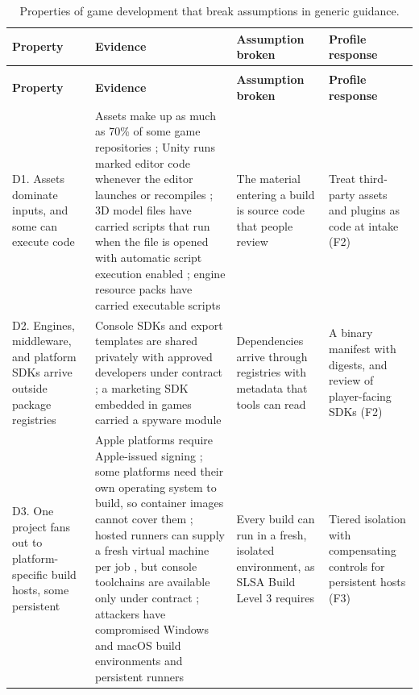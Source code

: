 \documentclass[acmsmall,screen,review]{acmart}
\begin{document}
\begingroup
\footnotesize
\begin{xltabular}{\linewidth}{@{}>{\hsize\raggedright\arraybackslash}X>{\hsize\raggedright\arraybackslash}X>{\hsize\raggedright\arraybackslash}X>{\hsize\raggedright\arraybackslash}X@{}}
\caption{Properties of game development that break assumptions in generic guidance.}\label{tab:3}\\
\toprule
\textbf{Property} & \textbf{Evidence} & \textbf{Assumption broken} & \textbf{Profile response} \\
\midrule
\endfirsthead
{}\\
\toprule
\textbf{Property} & \textbf{Evidence} & \textbf{Assumption broken} & \textbf{Profile response} \\
\midrule
\endhead
\bottomrule
\endlastfoot
D1. Assets dominate inputs, and some can execute code & Assets make up as much as 70\% of some game repositories \cite{pascarella2018how}; Unity runs marked editor code whenever the editor launches or recompiles \cite{unityndrunning}; 3D model files have carried scripts that run when the file is opened with automatic script execution enabled \cite{uzan2025morphisec}; engine resource packs have carried executable scripts \cite{gatlan2024hackers} & The material entering a build is source code that people review & Treat third-party assets and plugins as code at intake (F2) \\
D2. Engines, middleware, and platform SDKs arrive outside package registries & Console SDKs and export templates are shared privately with approved developers under contract \cite{godotndconsole}; a marketing SDK embedded in games carried a spyware module \cite{doctor2023android} & Dependencies arrive through registries with metadata that tools can read & A binary manifest with digests, and review of player-facing SDKs (F2) \\
D3. One project fans out to platform-specific build hosts, some persistent & Apple platforms require Apple-issued signing \cite{applendapp}; some platforms need their own operating system to build, so container images cannot cover them \cite{gamecinddocker}; hosted runners can supply a fresh virtual machine per job \cite{githubndgithub}, but console toolchains are available only under contract \cite{godotndconsole}; attackers have compromised Windows and macOS build environments \cite{mandiant20233cx} and persistent runners \cite{stawinski2024playing} & Every build can run in a fresh, isolated environment, as SLSA Build Level 3 requires \cite{openndslsa} & Tiered isolation with compensating controls for persistent hosts (F3) \\

\end{xltabular}
\end{document}
